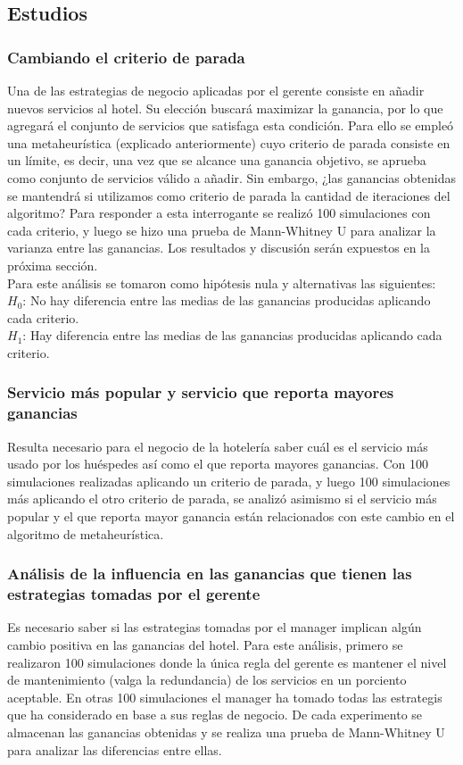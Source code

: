 \documentclass[12pt,a4paper]{article} \usepackage[spanish]{babel} \usepackage{graphicx} \usepackage{amsmath} \usepackage{amsfonts} \usepackage{amssymb} \usepackage{float} \usepackage{geometry}
\begin{document}
\subsection{Estudios}
\subsubsection{Cambiando el criterio de parada}
Una de las estrategias de negocio aplicadas por el gerente consiste en añadir nuevos servicios al hotel. Su elección buscará maximizar la ganancia, por lo que agregará el conjunto de servicios que satisfaga esta condición. Para ello se empleó una metaheurística (explicado anteriormente) cuyo criterio de parada consiste en un límite, es decir, una vez que se alcance una ganancia objetivo, se aprueba como conjunto de servicios válido a añadir. Sin embargo, ¿las ganancias obtenidas se mantendrá si utilizamos como criterio de parada la cantidad de iteraciones del algoritmo? Para responder a esta interrogante se realizó 100 simulaciones con cada criterio, y luego se hizo una prueba de Mann-Whitney U para analizar la varianza entre las ganancias. Los resultados y discusión serán expuestos en la próxima sección.\\
Para este análisis se tomaron como hipótesis nula y alternativas las siguientes:\\
$H_0$: No hay diferencia entre las medias de las ganancias producidas aplicando cada criterio.\\
$H_1$: Hay diferencia entre las medias de las ganancias producidas aplicando cada criterio.\\
\subsubsection{Servicio más popular y servicio que reporta mayores ganancias}
Resulta necesario para el negocio de la hotelería saber cuál es el servicio más usado por los huéspedes así como el que reporta mayores ganancias. Con 100 simulaciones realizadas aplicando un criterio de parada, y luego 100 simulaciones más aplicando el otro criterio de parada, se analizó asimismo si el servicio más popular y el que reporta mayor ganancia están relacionados con este cambio en el algoritmo de metaheurística.
\subsubsection{Análisis de la influencia en las ganancias que tienen las estrategias tomadas por el gerente}
Es necesario saber si las estrategias tomadas por el manager implican algún cambio positiva en las ganancias del hotel. Para este análisis, primero se realizaron 100 simulaciones donde la única regla del gerente es mantener el nivel de mantenimiento (valga la redundancia) de los servicios en un porciento aceptable. En otras 100 simulaciones el manager ha tomado todas las estrategis que ha considerado en base a sus reglas de negocio. De cada experimento se almacenan las ganancias obtenidas y se realiza una prueba de Mann-Whitney U para analizar las diferencias entre ellas.
\end{document}
